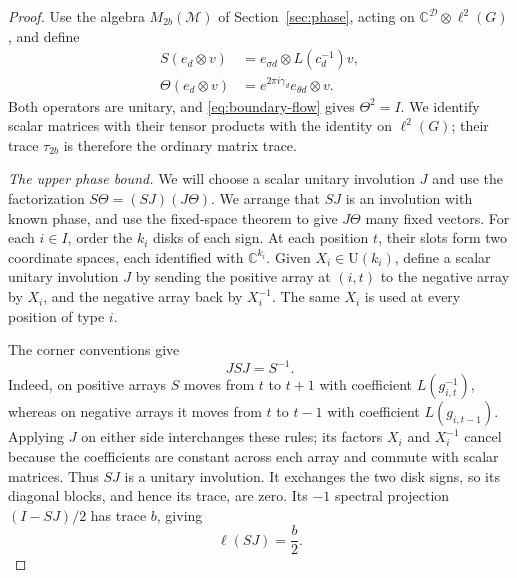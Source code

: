 \begin{proof}
Use the algebra $M_{2b}(\mathcal M)$ of Section~\ref{sec:phase}, acting on
$\mathbb C^{\mathcal D}\otimes\ell^2(G)$, and define
\begin{equation}\label{eq:surface-operators}
 \begin{split}
 S(e_d\otimes v)&=e_{\sigma d}\otimes L(c_d^{-1})v,\\
 \Theta(e_d\otimes v)&=e^{2\pi i\gamma_d}
                      e_{\theta d}\otimes v.
 \end{split}
\end{equation}
Both operators are unitary, and \eqref{eq:boundary-flow} gives
$\Theta^2=I$.  We identify scalar matrices with their tensor products
with the identity on $\ell^2(G)$; their trace $\tau_{2b}$ is therefore
the ordinary matrix trace.

\smallskip\noindent
\emph{The upper phase bound.}
We will choose a scalar unitary involution $J$ and use the factorization
$S\Theta=(SJ)(J\Theta)$.  We arrange that $SJ$ is an involution with
known phase, and use the fixed-space theorem to give $J\Theta$ many
fixed vectors.
For each $i\in I$, order the $k_i$ disks of each sign.  At each position
$t$, their slots form two coordinate spaces, each identified with
$\mathbb C^{k_i}$.  Given $X_i\in\mathrm U(k_i)$, define a scalar unitary
involution $J$ by sending the positive array at $(i,t)$ to the negative
array by $X_i$, and the negative array back by $X_i^{-1}$.
The same $X_i$ is used at every position of type $i$.

The corner conventions give
\begin{equation}\label{eq:reversal-involution}
 JSJ=S^{-1}.
\end{equation}
Indeed, on positive arrays $S$ moves from $t$ to $t+1$ with coefficient
$L(g_{i,t}^{-1})$, whereas on negative arrays it moves from $t$ to
$t-1$ with coefficient $L(g_{i,t-1})$.  Applying $J$ on either side
interchanges these rules; its factors $X_i$ and $X_i^{-1}$ cancel
because the coefficients are constant across each array and commute
with scalar matrices.  Thus $SJ$ is a unitary involution.  It exchanges
the two disk signs, so its diagonal blocks, and hence its trace, are
zero.  Its $-1$ spectral projection $(I-SJ)/2$ has trace $b$, giving
\begin{equation}\label{eq:disk-involution-phase}
 \ell(SJ)=\frac b2.
\end{equation}


\end{proof}
